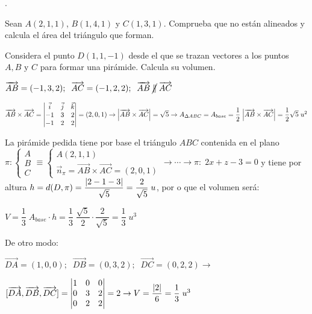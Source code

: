 \vspace{-10mm}
\begin{ejre}.

	Sean $A(2,1,1)$, $B(1,4,1)$ y $C(1,3,1)$. Comprueba que no están alineados y calcula el área del triángulo que forman.
	
	Considera el punto $D(1,1,-1)$ desde el que se trazan vectores a los puntos $A,B \text{ y } C$ para formar una pirámide. Calcula su volumen.
\end{ejre}
\begin{proofw}\renewcommand{\qedsymbol}{$\diamond$}	
	
\noindent $\overrightarrow{AB}=(-1,3,2);\;\; \overrightarrow{AC}=(-1,2,2);\;\; \overrightarrow{AB}\;\cancel{\parallel}\;\overrightarrow{AC}$

\noindent $ \overrightarrow{AB} \times \overrightarrow{AC}=
\left| \begin{matrix} \vec i&\vec j&\vec k\\-1&3&2\\-1&2&2 \end{matrix} \right|=(2,0,1)\to \abs{\overrightarrow{AB} \times \overrightarrow{AC}}=\sqrt{5}\to A_{\Delta ABC}=A_{base}=\dfrac 1 2 \; \abs{\overrightarrow{AB} \times \overrightarrow{AC}}=\dfrac 1 2 \sqrt{5}\; u^2$

\noindent La pirámide pedida tiene por base el triángulo $ABC$ contenida en el plano $\pi:\begin{cases} A\\B\\C \end{cases}\equiv \begin{cases} A(2,1,1) \\ \vec n_{\pi}=\overrightarrow{AB} \times \overrightarrow{AC}=(2,0,1) \end{cases} \to \cdots \to \pi:\; 2x+z-3=0$ y tiene por altura $h=d(D,\pi)=\dfrac {\abs{2-1-3}}{\sqrt{5}}=\dfrac 2 {\sqrt{5}}\; u$, por o que el volumen será: 

\noindent $V=\dfrac 1 3 \; A_{base}\cdot h=\dfrac 1 3 \;\dfrac{\sqrt{5}}{2} \cdot \dfrac{2}{\sqrt{5}}= \dfrac 1 3 \; u^3$

\noindent \textcolor{gris}{De otro modo:} 

\noindent \textcolor{gris}{$\overrightarrow{DA}=(1,0,0);\;\; \overrightarrow{DB}=(0,3,2);\;\;\overrightarrow{DC}=(0,2,2) \to $}

\noindent \textcolor{gris}{$[\overrightarrow{DA},\overrightarrow{DB},\overrightarrow{DC}]=\left|\begin{matrix}1&0&0\\0&3&2\\0&2&2\end{matrix}\right|=2 \to V=\dfrac {\abs{2}}{6}=\dfrac 1 3 \; u^3$ }	
\end{proofw}



